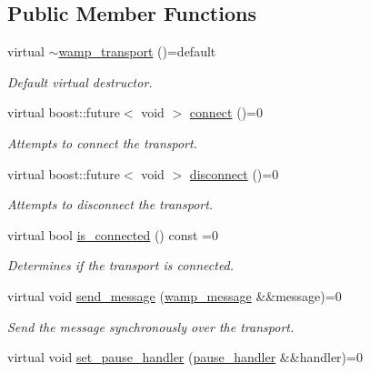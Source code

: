 \subsection*{Public Member Functions}
\begin{DoxyCompactItemize}
\item 
virtual \hyperlink{classautobahn_1_1wamp__transport_a79205fa2b20ea4fa9a99448cc019085d}{$\sim$wamp\+\_\+transport} ()=default\hypertarget{classautobahn_1_1wamp__transport_a79205fa2b20ea4fa9a99448cc019085d}{}\label{classautobahn_1_1wamp__transport_a79205fa2b20ea4fa9a99448cc019085d}

\begin{DoxyCompactList}\small\item\em Default virtual destructor. \end{DoxyCompactList}\item 
virtual boost\+::future$<$ void $>$ \hyperlink{classautobahn_1_1wamp__transport_a4ea198cfb1e76bb0b1916029a2b66585}{connect} ()=0
\begin{DoxyCompactList}\small\item\em Attempts to connect the transport. \end{DoxyCompactList}\item 
virtual boost\+::future$<$ void $>$ \hyperlink{classautobahn_1_1wamp__transport_a5abfd162d32de8cd7b8a56dbe0a22508}{disconnect} ()=0
\begin{DoxyCompactList}\small\item\em Attempts to disconnect the transport. \end{DoxyCompactList}\item 
virtual bool \hyperlink{classautobahn_1_1wamp__transport_a270c3f477bc573f975bbcae8ce2e83d3}{is\+\_\+connected} () const =0
\begin{DoxyCompactList}\small\item\em Determines if the transport is connected. \end{DoxyCompactList}\item 
virtual void \hyperlink{classautobahn_1_1wamp__transport_a75c9f6a2d4dc91974a0ab1bf1b22db6d}{send\+\_\+message} (\hyperlink{classautobahn_1_1wamp__message}{wamp\+\_\+message} \&\&message)=0
\begin{DoxyCompactList}\small\item\em Send the message synchronously over the transport. \end{DoxyCompactList}\item 
virtual void \hyperlink{classautobahn_1_1wamp__transport_ab85c7c4245d22400e85a69973f882576}{set\+\_\+pause\+\_\+handler} (\hyperlink{classautobahn_1_1wamp__transport_a834b28db4d03bdb3ff77a4638cc2867d}{pause\+\_\+handler} \&\&handler)=0

\end{DoxyCompactItemize}
